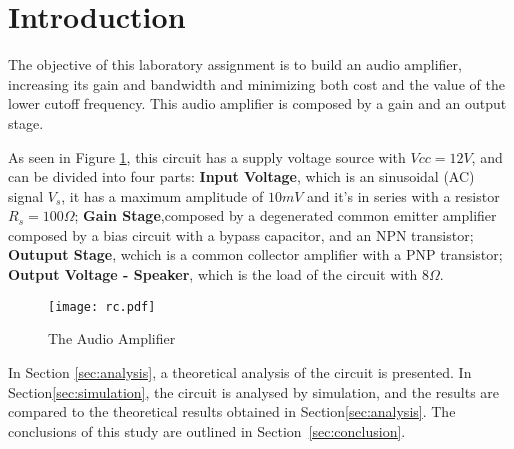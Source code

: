 \section{Introduction}
\label{sec:introduction}

The objective of this laboratory assignment is to build an audio amplifier, increasing its gain and bandwidth and minimizing both cost and the value of the lower cutoff frequency. This audio amplifier is composed by a gain and an output stage.

As seen in Figure \ref{fig:rc}, this circuit has a supply voltage source with $Vcc=12 V$, and can be divided into four parts: \textbf{Input Voltage}, which is an sinusoidal (AC) signal $V_s$, it has a maximum amplitude of $10 mV$ and it's in series with a resistor $R_s=100 \Omega$; \textbf{Gain Stage},composed by a degenerated common emitter amplifier composed by a bias circuit with a bypass capacitor, and an NPN transistor; \textbf{Outuput Stage}, wchich is a common collector amplifier with a PNP transistor; \textbf{Output Voltage - Speaker}, which is the load of the circuit with $8 \Omega$.


\begin{figure}[h] \centering
\texttt{[image: rc.pdf]}
\vspace{-5mm}
\caption{The Audio Amplifier}\label{fig:rc}
\end{figure}



In Section \ref{sec:analysis}, a theoretical analysis of the circuit is presented. In Section\ref{sec:simulation}, the circuit is analysed by simulation, and the results are compared to the theoretical results obtained in Section\ref{sec:analysis}. The conclusions of this study are outlined in Section~\ref{sec:conclusion}.





